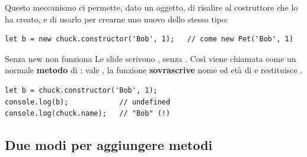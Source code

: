 Questo meccanismo ci permette, dato un oggetto, di risalire al costruttore che
lo ha creato, e di usarlo per crearne uno nuovo dello stesso tipo:

\begin{lstlisting}[style=js]
let b = new chuck.constructor('Bob', 1);   // come new Pet('Bob', 1)
\end{lstlisting}

\begin{warningbox}{{Senza new non funziona}}
  Le slide scrivono , senza . Così
   viene chiamata come un normale \textbf{metodo} di :
   vale , la funzione \textbf{sovrascrive} nome ed età di
   e restituisce .

\begin{lstlisting}[style=js]
let b = chuck.constructor('Bob', 1);
console.log(b);            // undefined
console.log(chuck.name);   // "Bob" (!)
\end{lstlisting}
\end{warningbox}

\subsection{Due modi per aggiungere metodi}

